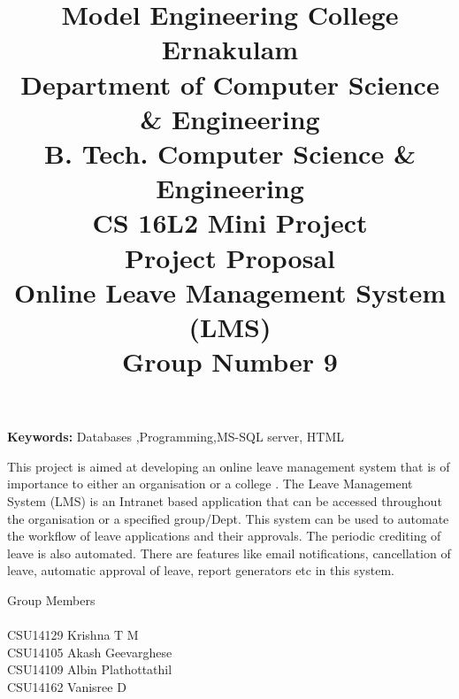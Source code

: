 \documentclass[onecolumn,10pt]{article}
\title{Model Engineering College Ernakulam
\\Department of Computer Science \& Engineering
\\B. Tech. Computer Science \& Engineering
\\CS 16L2 Mini Project
\\ Project Proposal
\\Online Leave Management System (LMS)
\\Group Number 9
}
\begin{document}
\maketitle
	
{{\bf Keywords:} Databases ,Programming,MS-SQL server, HTML

\abstract{} }
This project is aimed at developing an online leave  management system that is of importance to either an organisation or a college . The Leave Management System (LMS) is an Intranet based application that can be accessed                          throughout the organisation or a specified group/Dept. This system can be used to automate the workflow of leave applications and their approvals. The periodic crediting of leave is also automated. There are features like email notifications, cancellation of leave, automatic approval of leave, report generators etc in this system. 




\vspace{.5in}
%
Group Members\\
\\CSU14129 Krishna T M \\CSU14105 Akash Geevarghese\\CSU14109 Albin Plathottathil \\CSU14162 Vanisree D\\
\end{document}
